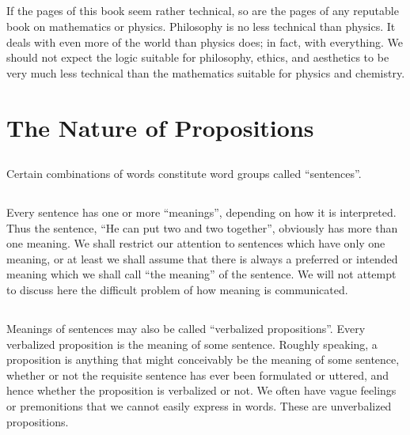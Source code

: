 \documentclass{book}
\let\oldmarginpar\marginpar
\renewcommand*{\marginpar}[1]{\oldmarginpar{\footnotesize#1}}
\begin{document}
\subsection{}
\label{sec:1.7}

If the pages of this book seem rather technical, so are the pages of any reputable book on mathematics or physics.  Philosophy is no less technical than physics.  It deals with even more of the world than physics does; in fact, with everything.  We should not expect the logic suitable for philosophy, ethics, and aesthetics to be very much less technical than the mathematics suitable for physics and chemistry.

\section{The Nature of Propositions}
\label{sec:2}

\subsection{}
\label{sec:2.1}

Certain combinations of words constitute word groups called “sentences”.

\subsection{}
\label{sec:2.2}

Every sentence has one or more “meanings”, depending on how it is interpreted.  Thus the sentence, “He can put two and two \marginpar{\hfill 6}together”, obviously has more than one meaning.  We shall restrict our attention to sentences which have only one meaning, or at least we shall assume that there is always a preferred or intended meaning which we shall call “the meaning” of the sentence.  We will not attempt to discuss here the difficult problem of how meaning is communicated.

\subsection{}
\label{sec:2.3}

Meanings of sentences may also be called “verbalized propositions”.  Every verbalized proposition is the meaning of some sentence.  Roughly speaking, a proposition is anything that might conceivably be the meaning of some sentence, whether or not the requisite sentence has ever been formulated or uttered, and hence whether the proposition is verbalized or not.  We often have vague feelings or premonitions that we cannot easily express in words.  These are unverbalized propositions.
\end{document}

